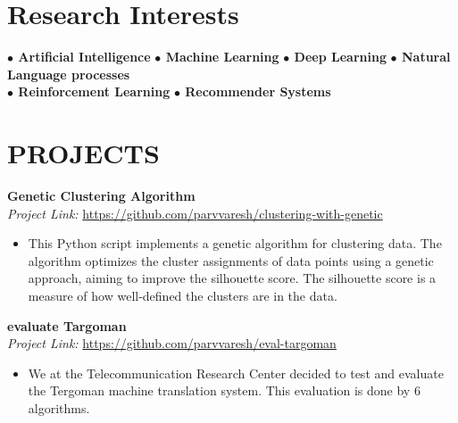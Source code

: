 \documentclass[a4paper,9pt]{extarticle}
\begin{document}
\section*{Research Interests}
\noindent


\textbf{ $\bullet$ Artificial Intelligence}\hspace*{16pt}
\textbf{ $\bullet$ Machine Learning} \hspace*{16pt}
\textbf{ $\bullet$ Deep Learning}\hspace*{16pt}
\textbf{ $\bullet$ Natural Language processes}\hspace*{16pt}\\
\textbf{ $\bullet$ Reinforcement Learning}\hspace*{16pt}
\textbf{ $\bullet$ Recommender Systems}\hspace*{16pt}






\section*{PROJECTS}

\noindent
\textbf{Genetic Clustering Algorithm} \hfill \\ %
\textit{Project Link:} \url{https://github.com/parvvaresh/clustering-with-genetic} \hfill 
\begin{itemize}
    \item This Python script implements a genetic algorithm for clustering data. The algorithm optimizes the cluster assignments of data points using a genetic approach, aiming to improve the silhouette score. The silhouette score is a measure of how well-defined the clusters are in the data.

\end{itemize}


\noindent
\textbf{evaluate Targoman} \hfill \\ %
\textit{Project Link:} \url{https://github.com/parvvaresh/eval-targoman} \hfill 
\begin{itemize}
    \item We at the Telecommunication Research Center decided to test and evaluate the Tergoman machine translation system. This evaluation is done by 6 algorithms. %
\end{itemize}
\end{document}
